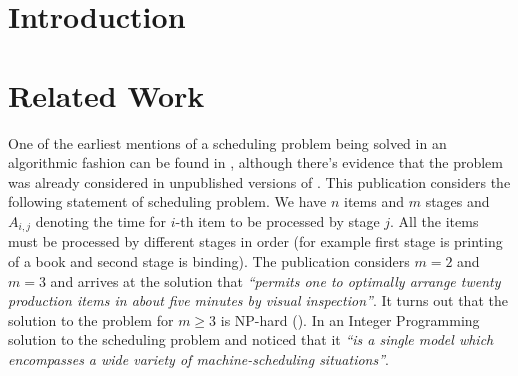 \documentclass{article}
\begin{document}
\begin{multicols}{2}
\begin{abstract}
\noindent %
\end{abstract}
\section{Introduction}

\section{Related Work}

One of the earliest mentions of a scheduling problem being solved in an algorithmic fashion can be found in \cite{johnson1954optimal}, although there's evidence that the problem was already considered in unpublished versions of \cite{bellman1956mathematical}. This publication considers the following statement of scheduling problem. We have $n$ items and $m$ stages and $A_{i,j}$ denoting the time for $i$-th item to be processed by stage $j$. All the items must be processed by different stages in order (for example first stage is printing of a book and second stage is binding). The publication considers $m=2$ and $m=3$ and arrives at the solution that \textit{``permits one to optimally arrange twenty production items in about five minutes by visual inspection''}. It turns out that the solution to the problem for $m \geq 3$ is NP-hard (\cite{garey1976complexity}). In \cite{wagner1959integer} an Integer Programming solution to the scheduling problem and noticed that it \textit{``is a single model which encompasses a wide variety of machine-scheduling situations''}.


\end{multicols}
\end{document}
